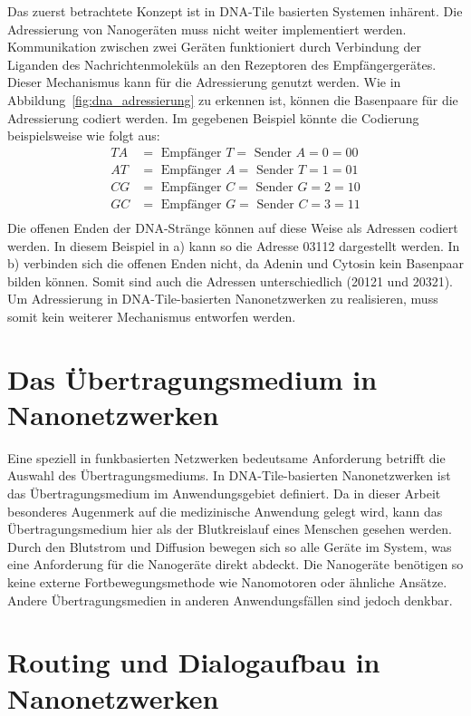 Das zuerst betrachtete Konzept ist in DNA-Tile basierten Systemen inhärent. Die Adressierung von Nanogeräten muss nicht weiter implementiert werden. Kommunikation zwischen zwei Geräten funktioniert durch Verbindung der Liganden des Nachrichtenmoleküls an den Rezeptoren des Empfängergerätes. Dieser Mechanismus kann für die Adressierung genutzt werden. Wie in Abbildung~\ref{fig:dna_adressierung} zu erkennen ist, können die Basenpaare für die Adressierung codiert werden. Im gegebenen Beispiel könnte die Codierung beispielsweise wie folgt aus:
\begin{align*}
    TA &= \text{ Empfänger } T = \text{ Sender } A = 0 = 00\\
    AT &= \text{ Empfänger } A = \text{ Sender } T = 1 = 01\\
    CG &= \text{ Empfänger } C = \text{ Sender } G = 2 = 10\\
    GC &= \text{ Empfänger } G = \text{ Sender } C = 3 = 11\\
\end{align*}
Die offenen Enden der DNA-Stränge können auf diese Weise als Adressen codiert werden. In diesem Beispiel in a) kann so die Adresse 03112 dargestellt werden. In b) verbinden sich die offenen Enden nicht, da Adenin und Cytosin kein Basenpaar bilden können. Somit sind auch die Adressen unterschiedlich (20121 und 20321). Um Adressierung in DNA-Tile-basierten Nanonetzwerken zu realisieren, muss somit kein weiterer Mechanismus entworfen werden. 

\section{Das Übertragungsmedium in Nanonetzwerken}

Eine speziell in funkbasierten Netzwerken bedeutsame Anforderung betrifft die Auswahl des Übertragungsmediums. In DNA-Tile-basierten Nanonetzwerken ist das Übertragungsmedium im Anwendungsgebiet definiert. Da in dieser Arbeit besonderes Augenmerk auf die medizinische Anwendung gelegt wird, kann das Übertragungsmedium hier als der Blutkreislauf eines Menschen gesehen werden. Durch den Blutstrom und Diffusion bewegen sich so alle Geräte im System, was eine Anforderung für die Nanogeräte direkt abdeckt. Die Nanogeräte benötigen so keine externe Fortbewegungsmethode wie Nanomotoren oder ähnliche Ansätze. Andere Übertragungsmedien in anderen Anwendungsfällen sind jedoch denkbar.

\section{Routing und Dialogaufbau in Nanonetzwerken}

